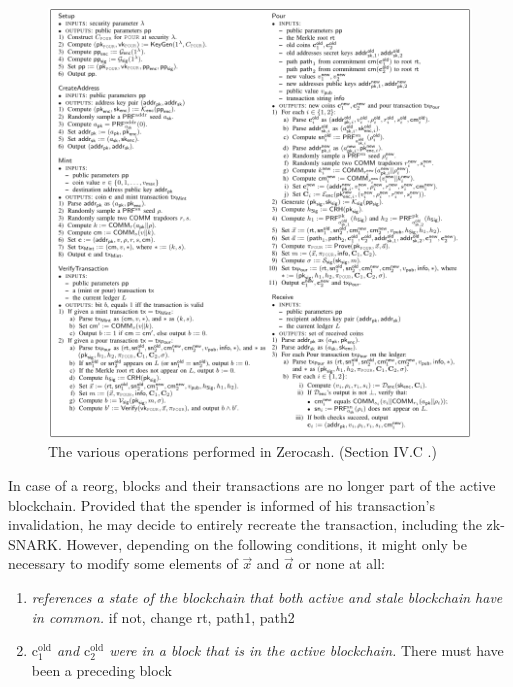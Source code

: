 \documentclass{article}
\begin{document}
\begin{figure}[t]
\includegraphics[width=\textwidth]{zerocash-zksnark.png}
\caption{The various operations performed in Zerocash. (Section IV.C \cite{bensasson:zerocash}.)} \label{fig:zerocash}
\centering
\end{figure}

In case of a reorg, blocks and their transactions are no longer part of the active blockchain.
Provided that the spender is informed of his transaction's invalidation, he may decide to entirely recreate the transaction, including the zk-SNARK.
However, depending on the following conditions, it might only be necessary to modify some elements of $\vec{x}$ and $\vec{a}$ or none at all:

\begin{enumerate}
        \item \textit{ references a state of the blockchain that both active and stale blockchain have in common.}
                if not, change rt, path1, path2
        \item \textit{$\text{c}_1^\text{old}$ and $\text{c}_2^\text{old}$ were in a block that is in the active blockchain.}
                There must have been a preceding block %
\end{enumerate}
\end{document}

